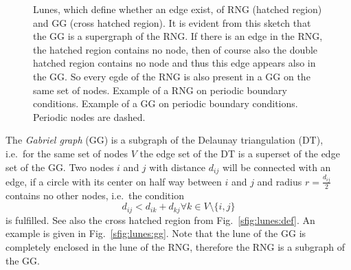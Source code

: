     \begin{figure}[htbp]
        \centering
        \caption[Gabriel and Relative Neighborhood Graph]
        {
             Lunes, which define whether an edge
                exist, of RNG (hatched region) and GG (cross hatched region).
                It is evident from this sketch that the GG is a supergraph
                of the RNG. If there is an edge in the RNG, the hatched
                region contains no node, then of course also the double
                hatched region contains no node and thus this edge appears
                also in the GG. So every egde of the RNG is also present
                in a GG on the same set of nodes.
             Example of a RNG on periodic
                boundary conditions.
             Example of a GG on
                periodic boundary conditions. Periodic nodes are dashed.
        }
        \label{fig:lunes}
    \end{figure}

    The \emph{Gabriel graph} (GG) \cite{Gabriel1969} is a subgraph
    of the Delaunay triangulation \cite{Delaunay1934,Katajainen}
    (DT), i.e.~for the same set of nodes \(V\) the edge set of the
    DT is a superset of the edge set of the GG. Two nodes \(i\) and
    \(j\) with distance \(d_{ij}\) will be connected with an edge,
    if a circle with its center on half way between \(i\) and \(j\)
    and radius \(r = \frac{d_{ij}}{2}\) contains no other nodes, i.e.~the
    condition
    \[d_{ij} < d_{ik} + d_{kj} \forall k \in V\setminus\{i,j\}\]
    is fulfilled. See
    also the cross hatched region from Fig.~\ref{sfig:lunes:def}. An
    example is given in Fig.~\ref {sfig:lunes:gg}. Note that the
    lune of the GG is completely enclosed in the lune of the RNG,
    therefore the RNG is a subgraph of the GG.

